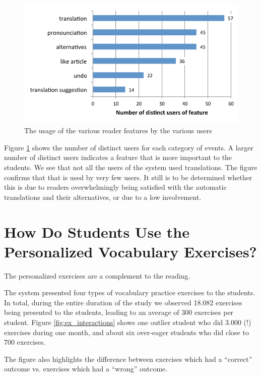   \begin{figure}[h!]
  \centering
    \includegraphics[width=0.9\columnwidth]{figures/reader_feature_usage_per_user}
    \caption{The usage of the various reader features by the various users }
    \label{fig:usage_per_user}
  \end{figure}


Figure \ref{fig:usage_per_user} shows the number of distinct users for each category of events. A larger number of distinct users indicates a feature that is more important to the students. We see that not all the users of the system used translations. The figure confirms that that  is used by very few users. It still is to be determined whether this is due to readers overwhelmingly being satisfied with the automatic translations and their alternatives, or due to a low involvement. 



\newpage
\section{How Do Students Use the Personalized Vocabulary Exercises?}

The personalized exercises are a complement to the reading. 

The system presented four types of vocabulary practice exercises to the students. In total, during the entire duration of the study we observed 18.082 exercises being presented to the students, leading to an average of 300 exercises per student. Figure \ref{fig:ex_interactions} shows one outlier student who did 3.000 (!) exercises during one month, and about six over-eager students who did close to 700 exercises. 

The figure also highlights the difference between exercises which had a ``correct'' outcome vs. exercises which had a ``wrong'' outcome. 


